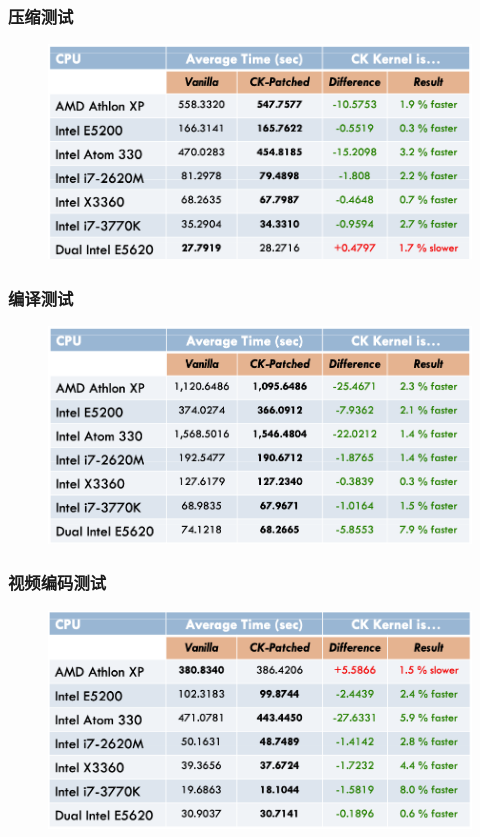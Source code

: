 \begin{frame}[fragile]
    \frametitle{压缩测试}
    \begin{figure}
    \includegraphics[width=0.8\linewidth]{figs/compression-test.png}
    \end{figure}

\end{frame}
% 
% 
\begin{frame}[fragile]
    \frametitle{编译测试}
    \begin{figure}
    \includegraphics[width=0.8\linewidth]{figs/make-test.png}
    \end{figure}

\end{frame}
% 
% 
\begin{frame}[fragile]
    \frametitle{视频编码测试}
    \begin{figure}
    \includegraphics[width=0.8\linewidth]{figs/video-test.png}
    \end{figure}

\end{frame}
% 

